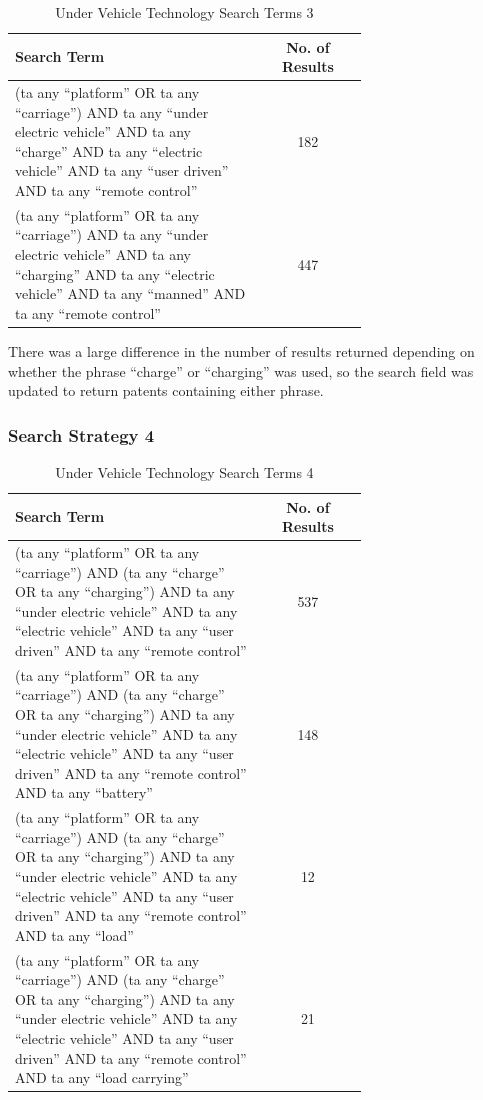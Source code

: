 \documentclass [12pt]{article}
\begin{document}
\begin{table}[H]
    \centering
    \setlength{\arrayrulewidth}{1.5pt}
    \begin{tabular}{|p{0.7\linewidth}|c|}
    \hline
    \cellcolor{gray!40}Search Term & \cellcolor{gray!40}No. of Results \\
    \hline
    (ta any “platform” OR ta any “carriage”) AND ta any “under electric vehicle” AND ta any “charge” AND ta any “electric vehicle” AND ta any “user driven” AND ta any “remote control” & 182 \\
    \hline
    (ta any “platform” OR ta any “carriage”) AND ta any “under electric vehicle” AND ta any “charging” AND ta any “electric vehicle” AND ta any “manned” AND ta any “remote control” & 447 \\
    \hline
    \end{tabular}
    \caption{Under Vehicle Technology Search Terms 3}
    \label{table:under_vehicle_search_strat_3}
\end{table}

There was a large difference in the number of results returned depending on whether the phrase “charge” or “charging” was used, so the search field was updated to return patents containing either phrase.

\subsubsection{Search Strategy 4}

\begin{table}[H]
    \centering
    \setlength{\arrayrulewidth}{1.5pt}
    \begin{tabular}{|p{0.7\linewidth}|c|}
    \hline
    \cellcolor{gray!40}Search Term & \cellcolor{gray!40}No. of Results \\
    \hline
    (ta any “platform” OR ta any “carriage”) AND (ta any “charge” OR ta any “charging”) AND ta any “under electric vehicle” AND ta any “electric vehicle” AND ta any “user driven” AND ta any “remote control” & 537 \\
    \hline
    (ta any “platform” OR ta any “carriage”) AND (ta any “charge” OR ta any “charging”) AND ta any “under electric vehicle” AND ta any “electric vehicle” AND ta any “user driven” AND ta any “remote control” AND ta any “battery” & 148 \\
    \hline
    (ta any “platform” OR ta any “carriage”) AND (ta any “charge” OR ta any “charging”) AND ta any “under electric vehicle” AND ta any “electric vehicle” AND ta any “user driven” AND ta any “remote control” AND ta any “load” & 12 \\
    \hline
    (ta any “platform” OR ta any “carriage”) AND (ta any “charge” OR ta any “charging”) AND ta any “under electric vehicle” AND ta any “electric vehicle” AND ta any “user driven” AND ta any “remote control” AND ta any “load carrying” & 21 \\
    \hline
    \end{tabular}
    \caption{Under Vehicle Technology Search Terms 4}
    \label{table:under_vehicle_search_strat_4}
\end{table}
\end{document}
